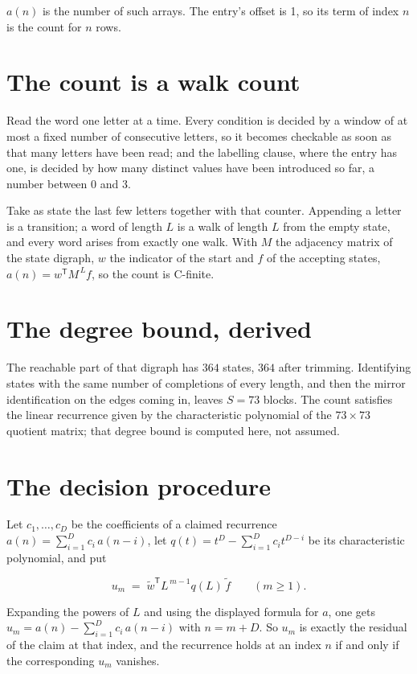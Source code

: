 \documentclass[11pt]{article}
\theoremstyle{definition}
\begin{document}
$a(n)$ is the number of such arrays. The entry's offset is 1, so its term of index $n$ is the count for $n$ rows.

\section{The count is a walk count}

Read the word one letter at a time. Every condition is decided by a window of at most a fixed number of consecutive letters, so it becomes checkable as soon as that many letters have been read; and the labelling clause, where the entry has one, is decided by how many distinct values have been introduced so far, a number between $0$ and 3.

Take as state the last few letters together with that counter. Appending a letter is a transition; a word of length $L$ is a walk of length $L$ from the empty state, and every word arises from exactly one walk. With $M$ the adjacency matrix of the state digraph, $w$ the indicator of the start and $f$ of the accepting states, $a(n) = w^{\mathsf T}M^{\,L}f$, so the count is C-finite.

\section{The degree bound, derived}

The reachable part of that digraph has $364$ states, $364$ after trimming. Identifying states with the same number of completions of every length, and then the mirror identification on the edges coming in, leaves $S = 73$ blocks. The count satisfies the linear recurrence given by the characteristic polynomial of the $73\times73$ quotient matrix; that degree bound is computed here, not assumed.

\section{The decision procedure}

Let $c_1,\dots,c_D$ be the coefficients of a claimed recurrence $a(n) = \sum_{i=1}^{D} c_i\,a(n-i)$, let $q(t) = t^{D} - \sum_{i=1}^{D} c_i t^{D-i}$ be its characteristic polynomial, and put

\[u_m \;=\; \tilde w^{\mathsf T} L^{\,m-1} q(L)\,\tilde f \qquad (m \ge 1).\]

Expanding the powers of $L$ and using the displayed formula for $a$, one gets $u_m = a(n) - \sum_{i=1}^{D} c_i\,a(n-i)$ with $n = m + D$. So $u_m$ is exactly the residual of the claim at that index, and the recurrence holds at an index $n$ if and only if the corresponding $u_m$ vanishes.
\end{document}
